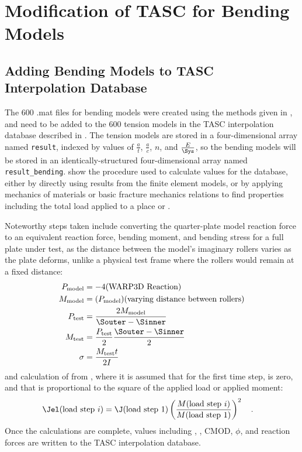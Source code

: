 \chapter{Modification of TASC for Bending Models} \label{chap:tasc-development}

\section{Adding Bending Models to TASC Interpolation Database}
\label{sec:add_bending_models}

The 600 {.mat} files for bending models were created using the methods given in , and need to be added to the 600 tension models in the TASC interpolation database described in .
The tension models are stored in a four-dimensional array named \verb|result|, indexed by values of \(\frac{a}{t}\), \(\frac{a}{c}\), \(n\), and \(\frac{E}{\Sys}\), so the bending models will be stored in an identically-structured four-dimensional array named \verb|result_bending|.
 show the procedure used to calculate values for the database, either by directly using results from the finite element models, or by applying mechanics of materials or basic fracture mechanics relations to find properties including the total load applied to a place or \Jel.

Noteworthy steps taken include converting the quarter-plate model reaction force to an equivalent reaction force, bending moment, and bending stress for a full plate under test, as the distance between the model's imaginary rollers varies as the plate deforms, unlike a physical test frame where the rollers would remain at a fixed distance:
\begin{align}
P_\text{model} &= -4(\text{WARP3D Reaction}) \\
M_\text{model} &= (P_\text{model})(\text{varying distance between rollers}) \\
P_\text{test} &= \frac{2 M_\text{model}}{\Souter-\Sinner} \\
M_\text{test} &= \frac{P_\text{test}}{2} \frac{\Souter-\Sinner}{2} \\
\sigma &= \frac{M_\text{test} t}{2 I}
\end{align}
and calculation of \Jel from \J, where it is assumed that for the first time step, \Jpl is zero, and that \Jel is proportional to the square of the applied load or applied moment:
\begin{align}
\Jel(\text{load step } i) &= \J(\text{load step 1}) \left(\frac{M(\text{load step } i)}{M(\text{load step 1})}\right)^2\quad.
\end{align}
Once the calculations are complete, values including \Jel, \J, CMOD, $\phi$, and reaction forces are written to the TASC interpolation database.


